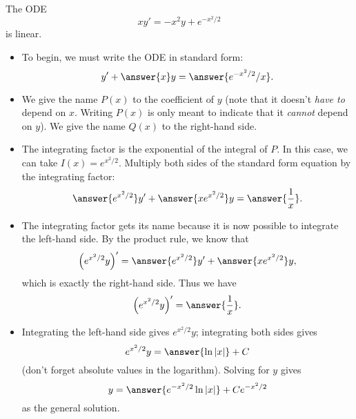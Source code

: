 \documentclass{ximera}
\begin{document}
\begin{example}
The ODE
\[ x y' = -x^2 y +  e^{-x^2/2}\]
is linear.
\begin{itemize}
\item To begin, we must write the ODE in standard form:
\[ y' + \answer{x} y = \answer{e^{-x^2/2}/x}. \]
\item We give the name $P(x)$ to the coefficient of $y$ (note that it doesn't \textit{have to} depend on $x$. Writing $P(x)$ is only meant to indicate that it \textit{cannot} depend on $y$). We give the name $Q(x)$ to the right-hand side.
\item The integrating factor is the exponential of the integral of $P$. In this case, we can take $I(x) = e^{x^2/2}$. Multiply both sides of the standard form equation by the integrating factor:
\[ \answer{e^{x^2/2}} y' + \answer{x e^{x^2/2}} y = \answer{\frac{1}{x}}. \]
\item The integrating factor gets its name because it is now possible to integrate the left-hand side.  By the product rule, we know that
\[ \left( e^{x^2/2} y \right)' = \answer{e^{x^2/2}} y' + \answer{x e^{x^2/2}} y, \]
which is exactly the right-hand side. Thus we have
\[ \left( e^{x^2/2} y \right)' = \answer{\frac{1}{x}}. \]
\item Integrating the left-hand side gives $e^{x^2/2} y$; integrating both sides gives
\[ e^{x^2/2} y = \answer{\ln |x|} + C \]
(don't forget absolute values in the logarithm).  Solving for $y$ gives
\[ y = \answer{e^{-x^2/2} \ln |x|} + C e^{-x^2/2} \]
as the general solution.
\end{itemize}
\end{example}
\end{document}
